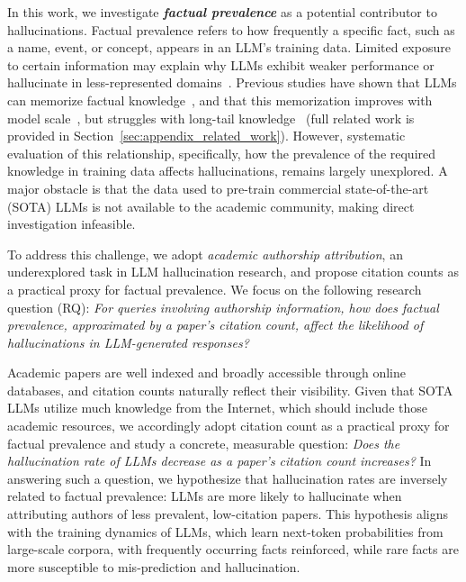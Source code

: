 \documentclass[11pt]{article}
\begin{document}
In this work, we investigate \emph{\textbf{factual prevalence}} as a potential contributor to hallucinations. Factual prevalence refers to how frequently a specific fact, such as a name, event, or concept, appears in an LLM's training data. Limited exposure to certain information may explain why LLMs exhibit weaker performance or hallucinate in less-represented domains~\citep{mallen2023_whenNotToTrustLMs}. Previous studies have shown that LLMs can memorize factual knowledge~\cite{chowdhery2022palm}, and that this memorization improves with model scale~\cite{carlini2022quantifying}, but struggles with long-tail knowledge~\cite{Kandpal2022_LLMStruggleLongTail,sun2024headtotail} (full related work is provided in Section~\ref{sec:appendix_related_work}).
However, systematic evaluation of this relationship, specifically, how the prevalence of the required knowledge in training data affects hallucinations, remains largely unexplored.
A major obstacle is that the data used to pre-train commercial state-of-the-art (SOTA) LLMs is not available to the academic community, making direct investigation infeasible.

To address this challenge, we adopt \emph{academic authorship attribution}, an underexplored task in LLM hallucination research, and propose citation counts as a practical proxy for factual prevalence.
We focus on the following research question (RQ): {\em For queries involving authorship information, how does factual prevalence, approximated by a paper’s citation count, affect the likelihood of hallucinations in LLM-generated responses?}

Academic papers are well indexed and broadly accessible through online databases, and citation counts naturally reflect their visibility. Given that SOTA LLMs utilize much knowledge from the Internet, which should include those academic resources, we accordingly adopt citation count as a practical proxy for factual prevalence and study a concrete, measurable question: \emph{Does the hallucination rate of LLMs decrease as a paper's citation count increases?} In answering such a question, we hypothesize that hallucination rates are inversely related to factual prevalence: LLMs are more likely to hallucinate when attributing authors of less prevalent, low-citation papers. This hypothesis aligns with the training dynamics of LLMs, which learn next-token probabilities from large-scale corpora, with frequently occurring facts reinforced, while rare facts are more susceptible to mis-prediction and hallucination.
\end{document}
